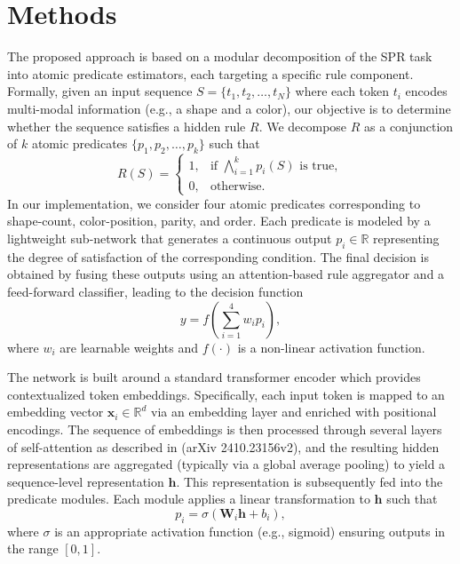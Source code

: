 \documentclass{article}
\begin{document}
\section{Methods}
The proposed approach is based on a modular decomposition of the SPR task into atomic predicate estimators, each targeting a specific rule component. Formally, given an input sequence \( S = \{t_1, t_2, \ldots, t_N\} \) where each token \( t_i \) encodes multi-modal information (e.g., a shape and a color), our objective is to determine whether the sequence satisfies a hidden rule \( R \). We decompose \( R \) as a conjunction of \( k \) atomic predicates \( \{p_1, p_2, \ldots, p_k\} \) such that  
\[
R(S) = \begin{cases} 
1, & \text{if } \bigwedge_{i=1}^{k} p_i(S) \text{ is true}, \\
0, & \text{otherwise}.
\end{cases}
\]
In our implementation, we consider four atomic predicates corresponding to shape-count, color-position, parity, and order. Each predicate is modeled by a lightweight sub-network that generates a continuous output \( p_i \in \mathbb{R} \) representing the degree of satisfaction of the corresponding condition. The final decision is obtained by fusing these outputs using an attention-based rule aggregator and a feed-forward classifier, leading to the decision function
\[
y = f\left(\sum_{i=1}^{4} w_i p_i\right),
\]
where \( w_i \) are learnable weights and \( f(\cdot) \) is a non-linear activation function.

The network is built around a standard transformer encoder which provides contextualized token embeddings. Specifically, each input token is mapped to an embedding vector \( \mathbf{x}_i \in \mathbb{R}^{d} \) via an embedding layer and enriched with positional encodings. The sequence of embeddings is then processed through several layers of self-attention as described in (arXiv 2410.23156v2), and the resulting hidden representations are aggregated (typically via a global average pooling) to yield a sequence-level representation \( \mathbf{h} \). This representation is subsequently fed into the predicate modules. Each module applies a linear transformation to \( \mathbf{h} \) such that 
\[
p_i = \sigma(\mathbf{W}_i \mathbf{h} + b_i),
\]
where \( \sigma \) is an appropriate activation function (e.g., sigmoid) ensuring outputs in the range \([0,1]\).
\end{document}
